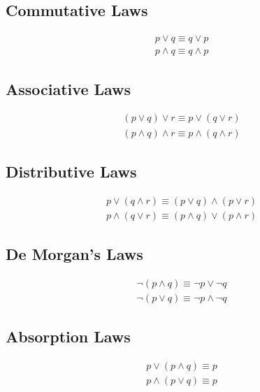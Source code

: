 \documentclass[12pt letter]{report}
\begin{document}
\subsection{Commutative Laws}

\begin{align*}
  p \vee q \equiv q \vee p \\
  p \wedge q \equiv q \wedge p
\end{align*}

\subsection{Associative Laws}

\begin{align*}
  \left( p \vee q \right)  \vee  r \equiv p \vee \left( q \vee r \right) \\
  \left( p \wedge q \right) \wedge  r \equiv p \wedge \left( q \wedge r \right)
\end{align*}

\subsection{Distributive Laws}

\begin{align*}
  p \vee \left( q \wedge r \right) \equiv \left( p \vee q \right)  \wedge \left( p \vee r \right) \\
  p \wedge \left( q \vee r  \right)  \equiv \left( p \wedge q  \right) \vee \left( p \wedge r \right)
\end{align*}

\subsection{De Morgan's Laws}

\begin{align*}
  \neg \left( p \wedge q \right) \equiv \neg p \vee \neg  q \\
  \neg \left( p \vee q  \right) \equiv \neg p \wedge \neg q
\end{align*}

\subsection{Absorption Laws}

\begin{align*}
  p \vee \left( p \wedge q  \right)  \equiv p \\
  p \wedge \left( p \vee q  \right) \equiv p
\end{align*}
\end{document}
